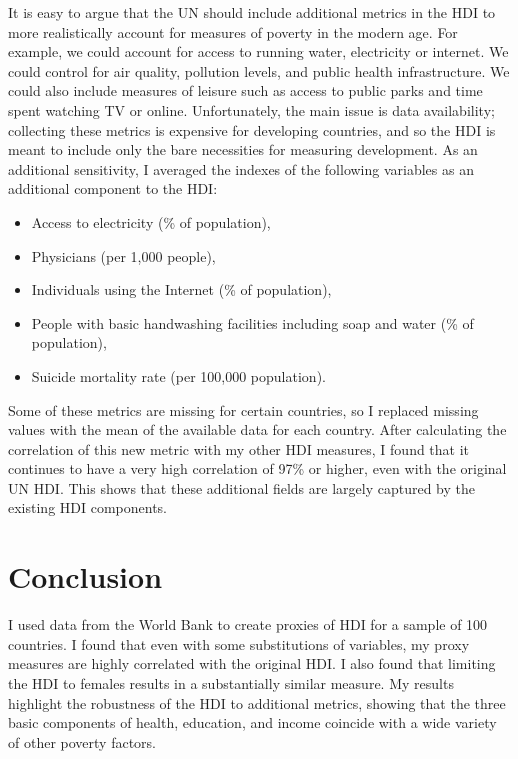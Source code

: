 \documentclass[12pt]{article}
\begin{document}
It is easy to argue that the UN should include additional metrics in the HDI to more realistically account for measures of poverty in the modern age. For example, we could account for access to running water, electricity or internet. We could control for air quality, pollution levels, and public health infrastructure. We could also include measures of leisure such as access to public parks and time spent watching TV or online. Unfortunately, the main issue is data availability; collecting these metrics is expensive for developing countries, and so the HDI is meant to include only the bare necessities for measuring development. As an additional sensitivity, I averaged the indexes of the following variables as an additional component to the HDI:
\begin{itemize}
    \singlespace
    \item Access to electricity (\% of population),
    \item Physicians (per 1,000 people),
    \item Individuals using the Internet (\% of population),
    \item People with basic handwashing facilities including soap and water (\% of population),
    \item Suicide mortality rate (per 100,000 population).
\end{itemize}
Some of these metrics are missing for certain countries, so I replaced missing values with the mean of the available data for each country. After calculating the correlation of this new metric with my other HDI measures, I found that it continues to have a very high correlation of 97\% or higher, even with the original UN HDI. This shows that these additional fields are largely captured by the existing HDI components.

\section{Conclusion}
I used data from the World Bank to create proxies of HDI for a sample of 100 countries. I found that even with some substitutions of variables, my proxy measures are highly correlated with the original HDI. I also found that limiting the HDI to females results in a substantially similar measure. My results highlight the robustness of the HDI to additional metrics, showing that the three basic components of health, education, and income coincide with a wide variety of other poverty factors.
\end{document}
